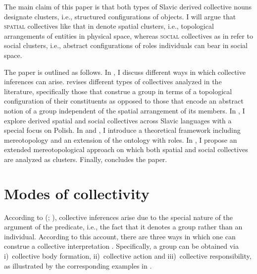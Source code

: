 \documentclass[output=paper]{langscibook}
\begin{document}
\ea \label{wan:ex:polish-collectives} \label{wan:ex:polish-kwiecie}
\label{wan:ex:polish-duchowienstwo}
\z
\z

\noindent The main claim of this paper is that both types of Slavic derived collective nouns designate clusters, i.e., structured configurations of objects. I will argue that \textsc{spatial} collectives like that in  denote spatial clusters, i.e., topological arrangements of entities in physical space, whereas \textsc{social} collectives as in  refer to social clusters, i.e., abstract configurations of roles individuals can bear in social space. 

The paper is outlined as follows. In , I discuss different ways in which collective inferences can arise.  revises different types of collectives analyzed in the literature, specifically those that construe a group in terms of a topological configuration of their constituents as opposed to those that encode an abstract notion of a group independent of the spatial arrangement of its members. In , I explore derived spatial and social collectives across Slavic languages with a special focus on Polish. In  and , I introduce a theoretical framework including mereotopology and an extension of the ontology with roles. In , I propose an extended mereotopological approach on which both spatial and social collectives are analyzed as clusters. Finally,  concludes the paper.

\section{Modes of collectivity}\label{wan:sec:modes-of-collectivity}

According to \citeauthor{landman1989groupsi} (\citeyear{landman1989groupsi}; \citeyear{landman2000events}), collective inferences arise due to the special nature of the argument of the predicate, i.e., the fact that it denotes a group rather than an individual. According to this account, there are three ways in which one can construe a collective interpretation \citep[165--169]{landman2000events}. Specifically, a group can be obtained via i)~collective body formation, ii)~collective action and iii)~collective responsibility, as illustrated by the corresponding examples in .
\end{document}
